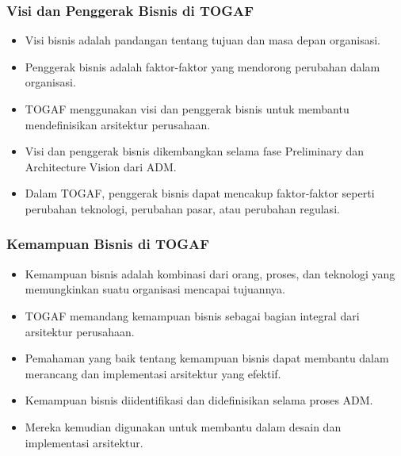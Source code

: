 \documentclass[aspectratio=169, table]{beamer}
\begin{document}
	\begin{frame}
		\frametitle{Visi dan Penggerak Bisnis di TOGAF}
		\begin{itemize}
			\item Visi bisnis adalah pandangan tentang tujuan dan masa depan organisasi.
			\item Penggerak bisnis adalah faktor-faktor yang mendorong perubahan dalam organisasi.
			\item TOGAF menggunakan visi dan penggerak bisnis untuk membantu mendefinisikan arsitektur perusahaan.
			\item Visi dan penggerak bisnis dikembangkan selama fase Preliminary dan Architecture Vision dari ADM.
			\item Dalam TOGAF, penggerak bisnis dapat mencakup faktor-faktor seperti perubahan teknologi, perubahan pasar, atau perubahan regulasi.
		\end{itemize}
	\end{frame}

	\begin{frame}
		\frametitle{Kemampuan Bisnis di TOGAF}
		\begin{itemize}
			\item Kemampuan bisnis adalah kombinasi dari orang, proses, dan teknologi yang memungkinkan suatu organisasi mencapai tujuannya.
			\item TOGAF memandang kemampuan bisnis sebagai bagian integral dari arsitektur perusahaan.
			\item Pemahaman yang baik tentang kemampuan bisnis dapat membantu dalam merancang dan implementasi arsitektur yang efektif.
			\item Kemampuan bisnis diidentifikasi dan didefinisikan selama proses ADM.
			\item Mereka kemudian digunakan untuk membantu dalam desain dan implementasi arsitektur.
		\end{itemize}
	\end{frame}
\end{document}

